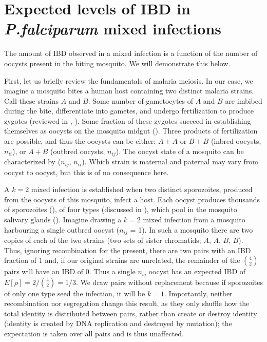 \documentclass[9pt]{article}
\begin{document}
\newpage
\FloatBarrier
\section{Expected levels of IBD in \textit{ P.falciparum } mixed infections}

The amount of IBD observed in a mixed infection is a function of the number of oocysts present in the biting mosquito. We will demonstrate this below.

First, let us briefly review the fundamentals of malaria meiosis. In our case, we imagine a mosquito bites a human host containing two distinct malaria strains. Call these strains $A$ and $B$. Some number of gametocytes of $A$ and $B$ are imbibed during the bite, differentiate into gametes, and undergo fertilization to produce zygotes (reviewed in \citet{Gosh2000}, \citet{Bennink2016}). Some fraction of these zygotes succeed in establishing themselves as oocysts on the mosquito midgut (\citet{Gosh2000}). Three products of fertilization are possible, and thus the oocysts can be either: $A+A$ or $B+B$ (inbred oocysts, $n_{ii}$), or $A+B$ (outbred oocysts, $n_{ij}$). The oocyst state of a mosquito can be characterized by ($n_{ij}$, $n_{ii}$). Which strain is maternal and paternal may vary from oocyst to oocyst, but this is of no consequence here.

A $k=2$ mixed infection is established when two distinct sporozoites, produced from the oocysts of this mosquito, infect a host. Each oocyst produces thousands of sporozoites (\citet{Beir1991}), of four types (discussed in \citet{McKenzie2001}), which pool in the mosquito salivary glands (\citet{Gosh2000}). Imagine drawing a $k=2$ mixed infection from a mosquito harbouring a single outbred oocyst ($n_{ij}$ = 1). In such a mosquito there are two copies of each of the two strains (two sets of sister chromatids; $A$, $A$, $B$, $B$). Thus, ignoring recombination for the present, there are two pairs with an IBD fraction of 1 and, if our original strains are unrelated, the remainder of the ${4 \choose 2}$ pairs will have an IBD of 0. Thus a single $n_{ij}$ oocyst has an expected IBD of $E[\rho]= 2/{4 \choose 2} = 1/3$. We draw pairs without replacement because if sporozoites of only one type seed the infection, it will be $k=1$.  Importantly, neither recombination nor segregation change this result, as they only shuffle how the total identity is distributed between pairs, rather than create or destroy identity (identity is created by DNA replication and destroyed by mutation); the expectation is taken over all pairs and is thus unaffected.
\end{document}
